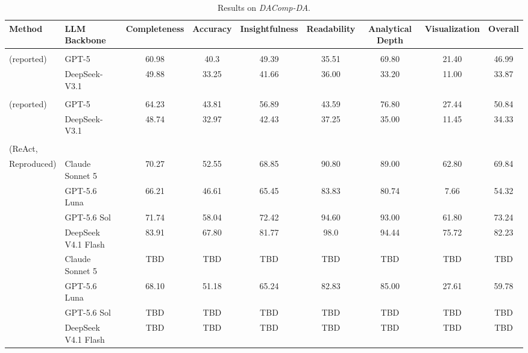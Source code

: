 \documentclass{article}
\newcommand{\method}{\textsc{Ours}}
\newcommand{\tabmethodreported}[1]{\makecell[l]{#1\\(reported)}}
\newcommand{\tabmethodbaseline}{\makecell[l]{Baseline\\(ReAct,\\Reproduced)}}
\begin{document}
\begin{table}[t]
  \caption{Results on \textit{DAComp-DA}.}
  \label{tab:dacomp-matrix}
  \centering
  \scriptsize
  \setlength{\tabcolsep}{2.5pt}
  \begin{tabular}{@{}>{\raggedright\arraybackslash}l>{\raggedright\arraybackslash}lccccccc@{}}
    \toprule
    Method & LLM Backbone & Completeness & Accuracy & Insightfulness & Readability & Analytical Depth & Visualization & Overall \\
    \midrule
    \multirow{2}{*}{\tabmethodreported{OpenHands}} & GPT-5 & 60.98 & 40.3 & 49.39 & 35.51 & 69.80 & 21.40 & 46.99 \\
      & DeepSeek-V3.1 & 49.88 & 33.25 & 41.66 & 36.00 & 33.20 & 11.00 & 33.87 \\
    \midrule
    \multirow{2}{*}{\tabmethodreported{DA-Agent}} & GPT-5 & 64.23 & 43.81 & 56.89 & 43.59 & 76.80 & 27.44 & 50.84 \\
      & DeepSeek-V3.1 & 48.74 & 32.97 & 42.43 & 37.25 & 35.00 & 11.45 & 34.33 \\
    \midrule
    \multirow{4}{*}{\tabmethodbaseline}
      & Claude Sonnet 5 & 70.27 & 52.55 & 68.85 & 90.80 & 89.00 & 62.80 & 69.84 \\
      & GPT-5.6 Luna & 66.21 & 46.61 & 65.45 & 83.83 & 80.74 & 7.66 & 54.32 \\
      & GPT-5.6 Sol & 71.74 & 58.04 & 72.42 & 94.60 & 93.00 & 61.80 & 73.24 \\
      & DeepSeek V4.1 Flash & 83.91 & 67.80 & 81.77 & 98.0 & 94.44 & 75.72 & 82.23 \\
    \midrule
    \multirow{4}{*}{\method{}}
      & Claude Sonnet 5 & TBD & TBD & TBD & TBD & TBD & TBD & TBD \\
      & GPT-5.6 Luna & 68.10 & 51.18 & 65.24 & 82.83 & 85.00 & 27.61 & 59.78 \\
      & GPT-5.6 Sol & TBD & TBD & TBD & TBD & TBD & TBD & TBD \\
      & DeepSeek V4.1 Flash & TBD & TBD & TBD & TBD & TBD & TBD & TBD \\
    \bottomrule
  \end{tabular}


\end{table}
\end{document}

